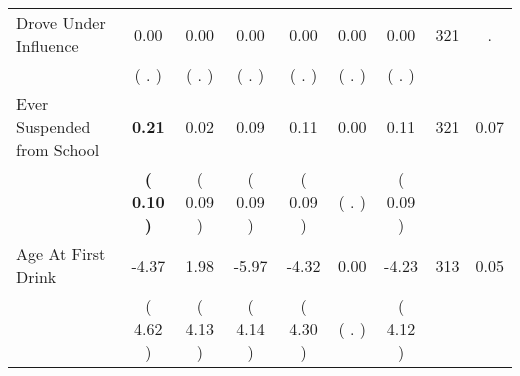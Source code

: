 \begin{tabular}{lcccccccc}
Drove Under Influence &      0.00 &      0.00 &      0.00 &      0.00 &      0.00 &      0.00 & 321 &          . \\ 
 & (        . ) & (        . ) & (        . ) & (        . ) & (        . ) & (        . ) & \\
Ever Suspended from School & \textbf{     0.21} &      0.02 &      0.09 &      0.11 &      0.00 &      0.11 & 321 &       0.07 \\ 
 & \textbf{(     0.10 )} & (     0.09 ) & (     0.09 ) & (     0.09 ) & (        . ) & (     0.09 ) & \\
Age At First Drink &     -4.37 &      1.98 &     -5.97 &     -4.32 &      0.00 &     -4.23 & 313 &       0.05 \\ 
 & (     4.62 ) & (     4.13 ) & (     4.14 ) & (     4.30 ) & (        . ) & (     4.12 ) & \\
\bottomrule
\end{tabular}
